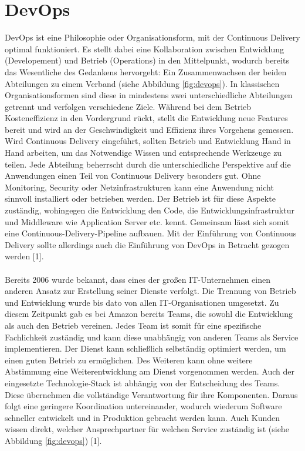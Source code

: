\section{DevOps}
DevOps ist eine Philosophie oder Organisationsform, mit der Continuous Delivery optimal funktioniert. Es stellt dabei eine Kollaboration zwischen Entwicklung (Developement) und Betrieb (Operations) in den Mittelpunkt, wodurch bereits das Wesentliche des Gedankens hervorgeht: Ein Zusammenwachsen der beiden Abteilungen zu einem Verband (siehe Abbildung \ref{fig:devops}). In klassischen Organisationsformen sind diese in mindestens zwei unterschiedliche Abteilungen getrennt und verfolgen verschiedene Ziele. Während bei dem Betrieb Kosteneffizienz in den Vordergrund rückt, stellt die Entwicklung neue Features bereit und wird an der Geschwindigkeit und Effizienz ihres Vorgehens gemessen. Wird Continuous Delivery eingeführt, sollten Betrieb und Entwicklung Hand in Hand arbeiten, um das Notwendige Wissen und entsprechende Werkzeuge zu teilen. Jede Abteilung beherrscht durch die unterschiedliche Perspektive auf die Anwendungen einen Teil von Continuous Delivery besonders gut. Ohne Monitoring, Security oder Netzinfrastrukturen kann eine Anwendung nicht sinnvoll installiert oder betrieben werden. Der Betrieb ist für diese Aspekte zuständig, wohingegen die Entwicklung den Code, die Entwicklungsinfrastruktur und Middleware wie Application Server etc. kennt. Gemeinsam lässt sich somit eine Continuous-Delivery-Pipeline aufbauen. Mit der Einführung von Continuous Delivery sollte allerdings auch die Einführung von DevOps in Betracht gezogen werden [1].\\ \\
Bereits 2006 wurde bekannt, dass eines der großen IT-Unternehmen einen anderen Ansatz zur Erstellung seiner Dienste verfolgt. Die Trennung von Betrieb und Entwicklung wurde bis dato von allen IT-Organisationen umgesetzt. Zu diesem Zeitpunkt gab es bei Amazon bereits Teams, die sowohl die Entwicklung als auch den Betrieb vereinen. Jedes Team ist somit für eine spezifische Fachlichkeit zuständig und kann diese unabhängig von anderen Teams als Service implementieren. Der Dienst kann schließlich selbständig optimiert werden, um einen guten Betrieb zu ermöglichen. Des Weiteren kann ohne weitere Abstimmung eine Weiterentwicklung am Dienst vorgenommen werden. Auch der eingesetzte Technologie-Stack ist abhängig von der Entscheidung des Teams. Diese übernehmen die vollständige Verantwortung für ihre Komponenten. Daraus folgt eine geringere Koordination untereinander, wodurch wiederum Software schneller entwickelt und in Produktion gebracht werden kann. Auch Kunden wissen direkt, welcher Ansprechpartner für welchen Service zuständig ist (siehe Abbildung \ref{fig:devops}) [1].\\ \\
